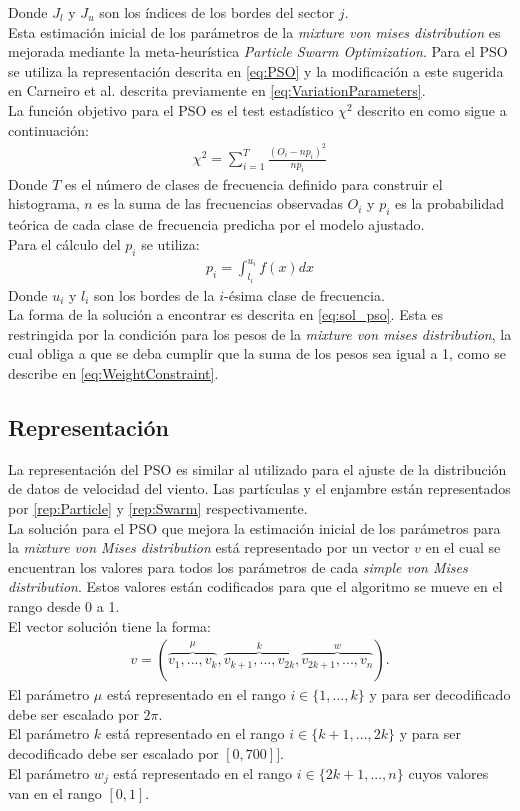 Donde $J_l$ y $J_u$ son los índices de los bordes del sector $j$.\\
Esta estimación inicial de los parámetros de la \emph{mixture von mises distribution} es mejorada mediante la meta-heurística \emph{Particle Swarm Optimization}. Para el PSO se utiliza la representación descrita en \ref{eq:PSO} y la modificación a este sugerida en Carneiro et al. \cite{Carneiro15} descrita previamente en \ref{eq:VariationParameters}.\\
La función objetivo para el PSO es el test estadístico $\chi^2$ descrito en \cite{Heckenbergerova15} como sigue a continuación:
\begin{align}\label{eq:FO_Direction}
    \chi^2 = \sum_{i=1}^{T}\frac{(O_i - np_{i})^2}{np_i}
\end{align}
Donde $T$ es el número de clases de frecuencia definido para construir el histograma, $n$ es la suma de las frecuencias observadas $O_i$ y $p_i$ es la probabilidad teórica de cada clase de frecuencia predicha por el modelo ajustado.\\
Para el cálculo del $p_i$ se utiliza:
\begin{align}
    p_i = \int_{l_i}^{u_i} f(x) dx
\end{align}
Donde $u_i$ y $l_i$ son los bordes de la $i$-ésima clase de frecuencia.\\
La forma de la solución a encontrar es descrita en \ref{eq:sol_pso}. Esta es restringida por la condición para los pesos de la \emph{mixture von mises distribution}, la cual obliga a que se deba cumplir que la suma de los pesos sea igual a 1, como se describe en \ref{eq:WeightConstraint}.
\subsection{Representación}\label{sec:Representacion}
La representación del PSO es similar al utilizado para el ajuste de la distribución de datos de velocidad del viento. Las partículas y el enjambre están representados por \ref{rep:Particle} y \ref{rep:Swarm} respectivamente.\\
La solución para el PSO que mejora la estimación inicial de los parámetros para la \emph{mixture von Mises distribution} está representado por un vector $v$ en el cual se encuentran los valores para todos los parámetros de cada \emph{simple von Mises distribution}. Estos valores están codificados para que el algoritmo se mueve en el rango desde 0 a 1.\\
El vector solución tiene la forma:
\begin{align}
    v = (\overbrace{v_1,...,v_k}^{\mu},\overbrace{v_{k+1},...,v_{2k}}^{k},\overbrace{v_{2k+1},...,v_{n}}^{w}).
\end{align}
El parámetro $\mu$ está representado en el rango $i \in \{1,...,k\}$ y para ser decodificado debe ser escalado por $2\pi$.\\
El parámetro $k$ está representado en el rango $i \in \{k+1,...,2k\}$ y para ser decodificado debe ser escalado por $[0, 700]]$.\\
El parámetro $w_j$ está representado en el rango $i \in \{2k+1,...,n\}$ cuyos valores van en el rango $[0,1]$.

